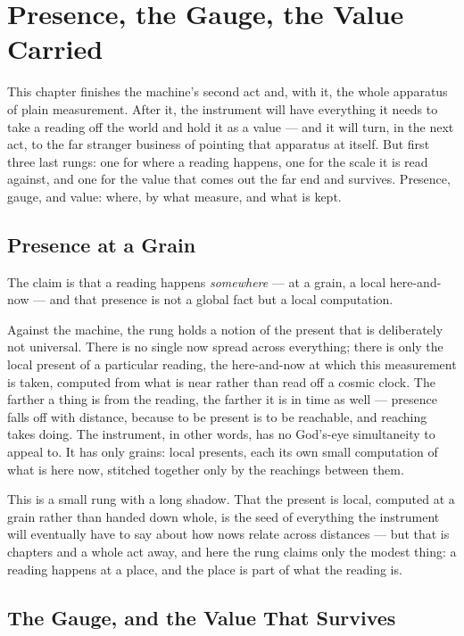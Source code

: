 \chapter{Presence, the Gauge, the Value Carried}

This chapter finishes the machine's second act and, with it, the whole apparatus of plain measurement. After it,
the instrument will have everything it needs to take a reading off the world and hold it as a value --- and it
will turn, in the next act, to the far stranger business of pointing that apparatus at itself. But first three
last rungs: one for where a reading happens, one for the scale it is read against, and one for the value that
comes out the far end and survives. Presence, gauge, and value: where, by what measure, and what is kept.

\section{Presence at a Grain}

The claim is that a reading happens \emph{somewhere} --- at a grain, a local here-and-now --- and that presence
is not a global fact but a local computation.

Against the machine, the rung holds a notion of the present that is deliberately not universal. There is no
single now spread across everything; there is only the local present of a particular reading, the here-and-now at
which this measurement is taken, computed from what is near rather than read off a cosmic clock. The farther a
thing is from the reading, the farther it is in time as well --- presence falls off with distance, because to be
present is to be reachable, and reaching takes doing. The instrument, in other words, has no God's-eye
simultaneity to appeal to. It has only grains: local presents, each its own small computation of what is here
now, stitched together only by the reachings between them.

This is a small rung with a long shadow. That the present is local, computed at a grain rather than handed down
whole, is the seed of everything the instrument will eventually have to say about how nows relate across
distances --- but that is chapters and a whole act away, and here the rung claims only the modest thing: a
reading happens at a place, and the place is part of what the reading is.

\section{The Gauge, and the Value That Survives}


